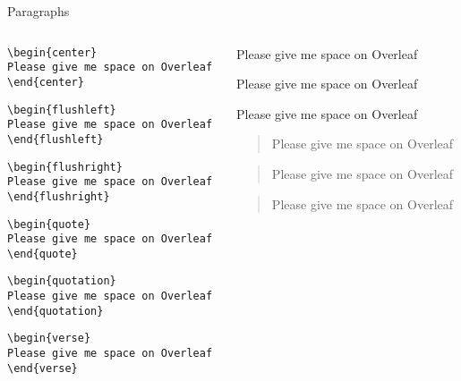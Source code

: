 \begin{frame}[fragile]{Paragraphs}
\begin{columns}
\begin{column}{6cm}
\vspace{-0.3cm}
\begin{lstlisting}
\begin{center}
Please give me space on Overleaf
\end{center}
\end{lstlisting}
\begin{lstlisting}
\begin{flushleft}
Please give me space on Overleaf
\end{flushleft}
\end{lstlisting}
\begin{lstlisting}
\begin{flushright}
Please give me space on Overleaf
\end{flushright}
\end{lstlisting}
\begin{lstlisting}
\begin{quote}
Please give me space on Overleaf
\end{quote}
\end{lstlisting}
\begin{lstlisting}
\begin{quotation}
Please give me space on Overleaf
\end{quotation}
\end{lstlisting}
\begin{lstlisting}
\begin{verse}
Please give me space on Overleaf
\end{verse}
\end{lstlisting}
\end{column}
\begin{column}{4cm}
\vspace{-0.5cm}
\footnotesize
\begin{center}
Please give me space on Overleaf
\end{center}
\begin{flushleft}
Please give me space on Overleaf
\end{flushleft}
\begin{flushright}
Please give me space on Overleaf
\end{flushright}
\begin{quote}
Please give me space on Overleaf
\end{quote}
\begin{quotation}
Please give me space on Overleaf
\end{quotation}
\begin{verse}
Please give me space on Overleaf
\end{verse}
\end{column}
\end{columns}
\end{frame}

